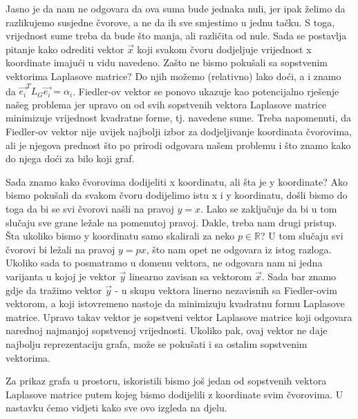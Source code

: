 \documentclass[11pt]{article}
\begin{document}
    Jasno je da nam ne odgovara da ova suma bude jednaka nuli, jer ipak želimo da razlikujemo susjedne čvorove, a ne da ih sve smjestimo u jednu tačku. S toga, vrijednost sume treba da bude što manja, ali različita od nule.
    Sada se postavlja pitanje kako odrediti vektor $\vec{x}$ koji svakom čvoru dodjeljuje vrijednost x koordinate imajući u vidu navedeno. 
	Zašto ne bismo pokušali sa sopstvenim vektorima Laplasove matrice?
    Do njih možemo (relativno) lako doći, a i znamo da $\vec{e_i}^T L_G \vec{e_i} = \alpha_i$.
	Fiedler-ov vektor se ponovo ukazuje kao potencijalno rješenje našeg problema jer upravo on od svih sopstvenih vektora Laplasove matrice minimizuje vrijednost kvadratne forme, tj. navedene sume.
    Treba napomenuti, da Fiedler-ov vektor nije uvijek najbolji izbor za dodjeljivanje koordinata čvorovima, ali je njegova prednost što po prirodi odgovara našem problemu i što znamo kako do njega doći za bilo koji graf.
    
	Sada znamo kako čvorovima dodijeliti x koordinatu, ali šta je y koordinate? 
	Ako bismo pokušali da svakom čvoru dodijelimo istu x i y koordinatu, došli bismo do toga da bi se svi čvorovi našli na pravoj $y = x$.
	Lako se zaključuje da bi u tom slučaju sve grane ležale na pomenutoj pravoj. Dakle, treba nam drugi pristup. 
    Šta ukoliko bismo y koordinatu samo skalirali za neko $p \in \mathbb{R}$? U tom slučaju svi čvorovi bi ležali na pravoj $y=px$, što nam opet ne odgovara iz istog razloga.
    Ukoliko sada to posmatramo u domenu vektora, ne odgovara nam ni jedna varijanta u kojoj je vektor $\vec{y}$ linearno zavisan sa vektorom $\vec{x}$.
    Sada bar znamo gdje da tražimo vektor $\vec{y}$ - u skupu vektora linerno nezavisnih sa Fiedler-ovim vektorom, a koji istovremeno nastoje da minimizuju kvadratnu formu Laplasove matrice.
    Upravo takav vektor je sopstveni vektor Laplasove matrice koji odgovara narednoj najmanjoj sopstvenoj vrijednosti. 
	Ukoliko pak, ovaj vektor ne daje najbolju reprezentaciju grafa, može se pokušati i sa ostalim sopstvenim vektorima.

    Za prikaz grafa u prostoru, iskoristili bismo još jedan od sopstvenih vektora Laplasove matrice putem kojeg bismo dodijelili z koordinate svim čvorovima.
    U nastavku ćemo vidjeti kako sve ovo izgleda na djelu.
\end{document}

